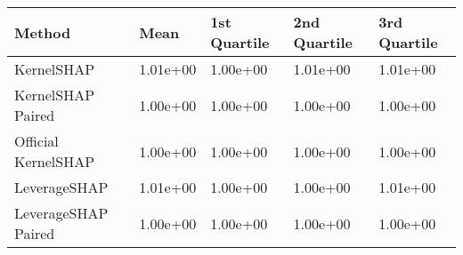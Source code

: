 \begin{tabular}{lllll}
  \toprule
  \textbf{Method} & \textbf{Mean} & \textbf{1st Quartile} & \textbf{2nd Quartile} & \textbf{3rd Quartile} \\ \midrule 
KernelSHAP & 1.01e+00 & \cellcolor{gold!60}1.00e+00 & 1.01e+00 & 1.01e+00\\
KernelSHAP Paired & \cellcolor{gold!60}1.00e+00 & \cellcolor{gold!60}1.00e+00 & \cellcolor{gold!60}1.00e+00 & \cellcolor{gold!60}1.00e+00\\
Official KernelSHAP & \cellcolor{gold!60}1.00e+00 & \cellcolor{gold!60}1.00e+00 & \cellcolor{gold!60}1.00e+00 & \cellcolor{gold!60}1.00e+00\\
LeverageSHAP & 1.01e+00 & \cellcolor{gold!60}1.00e+00 & \cellcolor{gold!60}1.00e+00 & 1.01e+00\\
LeverageSHAP Paired & \cellcolor{gold!60}1.00e+00 & \cellcolor{gold!60}1.00e+00 & \cellcolor{gold!60}1.00e+00 & \cellcolor{gold!60}1.00e+00\\
\bottomrule
\end{tabular}